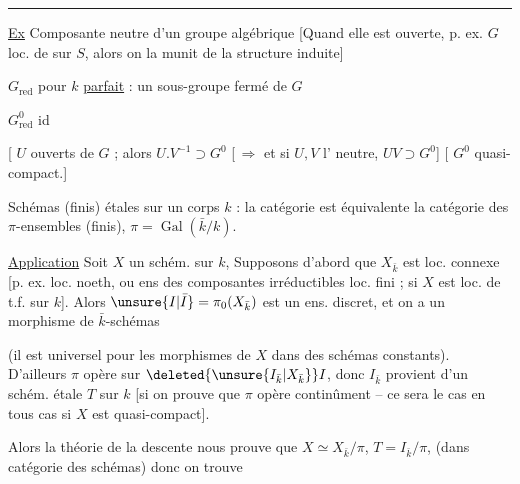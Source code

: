 \par\noindent\rule{.94\linewidth}{.4pt}\par
\uline{Ex} Composante neutre  d'un groupe algébrique \deleted{[elle est quasi-compacte} [Quand elle est ouverte, p. ex. $G$ loc. de  sur $S$, alors on la munit de la structure induite]

$G_{\mathrm{red}}$ pour $k$ \uline{parfait} : un sous-groupe fermé de $G$

$G^{0}_{\mathrm{red}}$ id

[ $U$   ouverts de $G$ ; alors $U.V^{-1}\supset G^0$ [\,$\Rightarrow$ et si $U,V$  l' neutre, $UV\supset G^0$] [ $G^0$ quasi-compact.]

Schémas (finis) étales sur un corps $k$ : la catégorie est équivalente  la catégorie des $\pi$-ensembles (finis), $\pi=\operatorname{Gal}(\bar k/k)$.

\uline{Application} Soit $X$ un schém. sur $k$, Supposons d'abord que $X_{\bar k}$ est loc. connexe [p. ex. loc. noeth, ou ens des composantes irréductibles loc. fini ;  si $X$ est loc. de t.f. sur $k$]. Alors $\unsure{I|\bar I}=\pi_0(X_{\bar k})$ est un ens. discret, et on a un  morphisme de $\bar k$-schémas

(il est universel pour les morphismes de $X$ dans des schémas constants). D'ailleurs $\pi$ opère sur $\deleted{\unsure{I_{\bar k}|X_{\bar k}}} I$, donc $I_{\bar k}$ provient d'un  schém. étale $T$ sur $k$ [si on prouve que $\pi$ opère continûment -- ce sera le cas en tous cas si $X$ est quasi-compact].


Alors la théorie de la descente nous prouve que $X\simeq X_{\bar k}/\pi$, $T=I_{\bar k}/\pi$, (dans catégorie des schémas) donc on trouve

